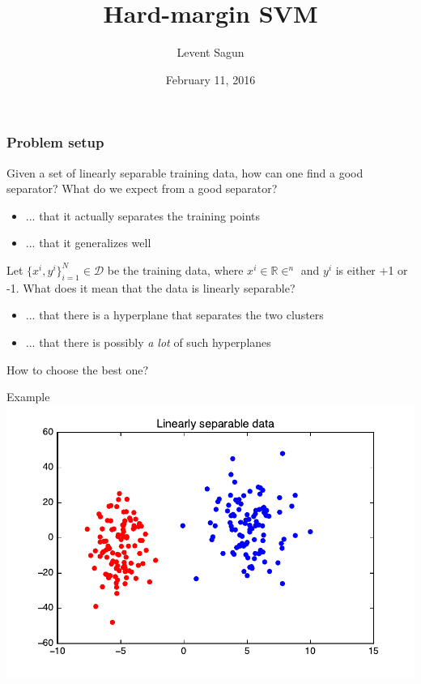 \documentclass{beamer}
\title{Hard-margin SVM}
\author{Levent Sagun}
\institute{New York University}
\date{February 11, 2016}
\begin{document}

\frame{\titlepage}


\begin{frame}
\frametitle{Problem setup}

Given a set of linearly separable training data, how can one find a good separator? What do we expect from a good separator?

\begin{itemize}
    \item<1-> ... that it actually separates the training points
    \item<1-> ... that it generalizes well
\end{itemize}

Let $\{x^i, y^i\}_{i=1}^N \in \mathcal{D} $ be the training data, where $x^i \in \mathbb{R}\in^n$ and $y^i$ is either +1 or -1. What does it mean that the data is linearly separable?

\begin{itemize}
    \item<1-> ... that there is a hyperplane that separates the two clusters
    \item<1-> ... that there is possibly \textit{a lot} of such hyperplanes
\end{itemize}

How to choose the best one?

\end{frame}


\begin{frame}{Example}
    \includegraphics[scale=0.7]{figures/SVM_data.pdf}
\end{frame}
\end{document}
